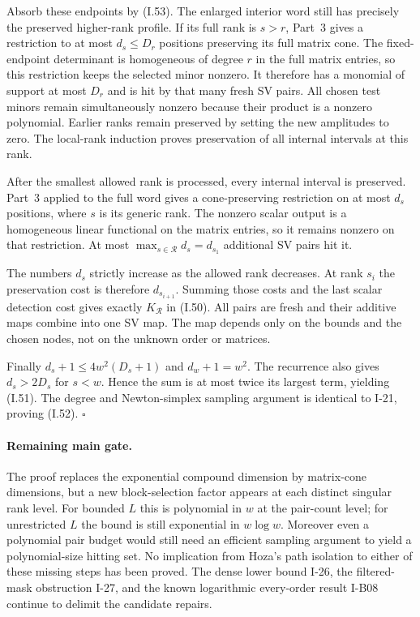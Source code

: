 \documentclass[11pt,a4paper]{article}
\theoremstyle{definition}\newtheorem{definition}{Definition}
\begin{document}
Absorb these endpoints by (I.53).  The enlarged interior
word still has precisely the preserved higher-rank profile.
If its full rank is $s>r$, Part~3 gives a restriction to at
most $d_s\le D_r$ positions preserving its full matrix cone.
The fixed-endpoint determinant is homogeneous of degree
$r$ in the full matrix entries, so this restriction keeps
the selected minor nonzero.  It therefore has a monomial
of support at most $D_r$ and is hit by that many fresh SV
pairs.  All chosen test minors remain simultaneously nonzero
because their product is a nonzero polynomial.  Earlier
ranks remain preserved by setting the new amplitudes to zero.
The local-rank induction proves preservation of all internal
intervals at this rank.

After the smallest allowed rank is processed, every internal
interval is preserved.  Part~3 applied to the full word gives
a cone-preserving restriction on at most $d_s$ positions,
where $s$ is its generic rank.  The nonzero scalar output
is a homogeneous linear functional on the matrix entries,
so it remains nonzero on that restriction.  At most
$\max_{s\in\mathcal R}d_s=d_{s_1}$ additional SV pairs hit it.

The numbers $d_s$ strictly increase as the allowed rank
decreases.  At rank $s_i$ the preservation cost is therefore
$d_{s_{i+1}}$.  Summing those costs and the last scalar
detection cost gives exactly $K_{\mathcal R}$ in (I.50).
All pairs are fresh and their additive maps combine into
one SV map.  The map depends only on the bounds and the
chosen nodes, not on the unknown order or matrices.

Finally $d_s+1\le4w^2(D_s+1)$ and $d_w+1=w^2$.
The recurrence also gives $d_s>2D_s$ for $s<w$.
Hence the sum is at most twice its largest term, yielding
(I.51).  The degree and Newton-simplex sampling argument is
identical to I-21, proving (I.52).
\hfill$\square$

\paragraph{Remaining main gate.}
The proof replaces the exponential compound dimension by
matrix-cone dimensions, but a new block-selection factor
appears at each distinct singular rank level.  For bounded
$L$ this is polynomial in $w$ at the pair-count level;
for unrestricted $L$ the bound is still exponential in
$w\log w$.  Moreover even a polynomial pair budget would
still need an efficient sampling argument to yield a
polynomial-size hitting set.  No implication from Hoza's
path isolation to either of these missing steps has been
proved.  The dense lower bound I-26, the filtered-mask
obstruction I-27, and the known logarithmic every-order
result I-B08 continue to delimit the candidate repairs.
\end{document}
